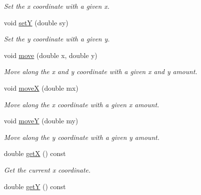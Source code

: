 \begin{DoxyCompactItemize}
\begin{DoxyCompactList}\small\item\em Set the x coordinate with a given x. \end{DoxyCompactList}\item 
void \hyperlink{classObject_acab13582a9cb12392fc7a83d1d80e3d6}{setY} (double sy)\hypertarget{classObject_acab13582a9cb12392fc7a83d1d80e3d6}{}\label{classObject_acab13582a9cb12392fc7a83d1d80e3d6}

\begin{DoxyCompactList}\small\item\em Set the y coordinate with a given y. \end{DoxyCompactList}\item 
void \hyperlink{classObject_af4133db64f4051294dc103a2f3553a6a}{move} (double x, double y)\hypertarget{classObject_af4133db64f4051294dc103a2f3553a6a}{}\label{classObject_af4133db64f4051294dc103a2f3553a6a}

\begin{DoxyCompactList}\small\item\em Move along the x and y coordinate with a given x and y amount. \end{DoxyCompactList}\item 
void \hyperlink{classObject_a43f3220cb27a282c28afaea57ac9a098}{moveX} (double mx)\hypertarget{classObject_a43f3220cb27a282c28afaea57ac9a098}{}\label{classObject_a43f3220cb27a282c28afaea57ac9a098}

\begin{DoxyCompactList}\small\item\em Move along the x coordinate with a given x amount. \end{DoxyCompactList}\item 
void \hyperlink{classObject_a58bab6e78efd8282996d742530c98034}{moveY} (double my)\hypertarget{classObject_a58bab6e78efd8282996d742530c98034}{}\label{classObject_a58bab6e78efd8282996d742530c98034}

\begin{DoxyCompactList}\small\item\em Move along the y coordinate with a given y amount. \end{DoxyCompactList}\item 
double \hyperlink{classObject_a313c75c1fdb4a1521ed91b27fd648f44}{getX} () const \hypertarget{classObject_a313c75c1fdb4a1521ed91b27fd648f44}{}\label{classObject_a313c75c1fdb4a1521ed91b27fd648f44}

\begin{DoxyCompactList}\small\item\em Get the current x coordinate. \end{DoxyCompactList}\item 
double \hyperlink{classObject_a5c85757552e0dc8a69baf769540cc612}{getY} () const \hypertarget{classObject_a5c85757552e0dc8a69baf769540cc612}{}\label{classObject_a5c85757552e0dc8a69baf769540cc612}


\end{DoxyCompactItemize}
